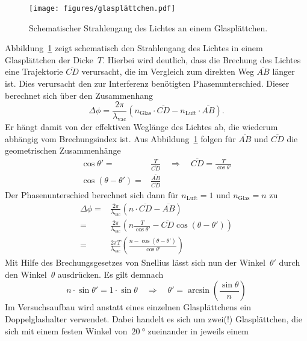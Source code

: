 \begin{figure}[htb]
  \centering
  \texttt{[image: figures/glasplättchen.pdf]}
  \caption{Schematischer Strahlengang des Lichtes an einem Glasplättchen.}
  \label{fig:plättchen}
\end{figure}

Abbildung~\ref{fig:plättchen} zeigt schematisch den Strahlengang des Lichtes in
einem Glasplättchen der Dicke~$T$. Hierbei wird deutlich, dass die Brechung des
Lichtes eine Trajektorie $\overline{CD}$ verursacht, die im Vergleich zum
direkten Weg $\overline{AB}$ länger ist. Dies verursacht den zur Interferenz
benötigten Phasenunterschied. Dieser berechnet sich über den Zusammenhang
\begin{equation}
  \Delta\phi=\frac{2\pi}{\lambda_{\text{vac}}}\left(n_{\text{Glas}}\cdot
  \overline{CD}-n_{\text{Luft}}\cdot\overline{AB}\right).
\end{equation}
Er hängt damit von der effektiven Weglänge des Lichtes ab, die wiederum abhängig
vom Brechungsindex ist. Aus Abbildung~\ref{fig:plättchen} folgen für
$\overline{AB}$ und $\overline{CD}$ die geometrischen Zusammenhänge
\begin{align}
  \cos\theta'=&\frac{T}{\overline{CD}}\quad\Rightarrow\quad\overline{CD}
  =\frac{T}{\cos\theta'} \\
  \cos(\theta-\theta')=&\frac{\overline{AB}}{\overline{CD}}
\end{align}
Der Phasenunterschied berechnet sich dann für $n_{\text{Luft}}=1$ und
$n_{\text{Glas}}=n$ zu
\begin{align*}
  \Delta\phi=&\frac{2\pi}{\lambda_{\text{vac}}}(n\cdot\overline{CD}
  -\overline{AB}) \\
  =&\frac{2\pi}{\lambda_{\text{vac}}}\left(n\frac{T}{\cos{\theta'}}
  -\overline{CD}\cos(\theta-\theta')\right) \\
  =&\frac{2\pi T}{\lambda_{\text{vac}}}\left(\frac{n-\cos(\theta-\theta')}
  {\cos\theta'}\right)
\end{align*}
Mit Hilfe des Brechungsgesetzes von Snellius lässt sich nun der Winkel~$\theta'$
durch den Winkel~$\theta$ ausdrücken. Es gilt demnach
\begin{equation}
  n\cdot\sin\theta'=1\cdot\sin\theta\quad\Rightarrow\quad\theta'
  =\arcsin\left(\frac{\sin\theta}{n}\right)
\end{equation}
Im Versuchsaufbau wird anstatt eines einzelnen Glasplättchens ein
Doppelglashalter verwendet. Dabei handelt es sich um zwei(!) Glasplättchen, die
sich mit einem festen Winkel von~$\SI{20}{\degree}$ zueinander in jeweils einem
